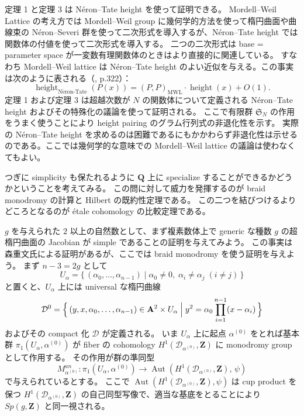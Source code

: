 \documentclass[uplatex,dvipdfmx]{jlreq}
\def\height{\operatorname{height}}
\def\Aut{\operatorname{Aut}}
\begin{document}
定理 1 と定理 3 は Néron--Tate height を使って証明できる。
Mordell--Weil Lattice の考え方では Mordell--Weil group に幾何学的方法を使って楕円曲面や曲線束の Néron--Severi 群を使って二次形式を導入するが、Néron--Tate height では関数体の付値を使って二次形式を導入する。
二つの二次形式は base = parameter space が一変数有理関数体のときはより直接的に関連している。
すなわち Mordell--Weil lattice は Néron--Tate height のよい近似を与える。この事実は次のように表される（\cite{L}, p.322）：
\[
  \height_{\mathrm{N\acute{e}ron\text{-}Tate}}(P(x))
  = (P, P)_{\mathrm{MWL}} \cdot \height(x) + O(1).
\]
定理 1 および定理 3 は超越次数が $N$ の関数体について定義される Néron--Tate height およびその特殊化の議論を使って証明される。
ここで有限群 $\mathfrak{S}_N$ の作用をうまく使うことにより height pairing のグラム行列式の非退化性を示す。
実際の Néron--Tate height を求めるのは困難であるにもかかわらず非退化性は示せるのである。ここでは幾何学的な意味での Mordell--Weil lattice の議論は使わなくてもよい。

つぎに simplicity も保たれるように $\mathbf{Q}$ 上に specialize することができるかどうかということを考えてみる。
この問に対して威力を発揮するのが braid monodromy の計算と Hilbert の既約性定理である。
この二つを結びつけるよりどころとなるのが étale cohomology の比較定理である。

$g$ を与えられた $2$ 以上の自然数として、まず複素数体上で generic な種数 $g$ の超楕円曲面の Jacobian が simple であることの証明を与えてみよう。
この事実は森重文氏による証明があるが、ここでは braid monodromy を使う証明を与えよう。
まず $n - 3 = 2g$ として
\[
  U_{\alpha} = \bigl\{\, (\alpha_0, \dots, \alpha_{n-1}) \mid \alpha_0 \neq 0,\; \alpha_i \neq \alpha_j \; (i \neq j) \,\bigr\}
\]
と置くと、$U_{\alpha}$ 上には universal な楕円曲線
\[
  \mathcal{D}^0 = \Bigl\{\, (y, x, \alpha_0, \dots, \alpha_{n-1}) \in \mathbf{A}^2 \times U_{\alpha} \Bigm| y^2 = \alpha_0 \prod_{i=1}^{n-1}(x - \alpha_i) \,\Bigr\}
\]
およびその compact 化 $\mathcal{D}$ が定義される。
いま $U_{\alpha}$ 上に起点 $\alpha^{(0)}$ をとれば基本群 $\pi_1(U_{\alpha}, \alpha^{(0)})$ が fiber の cohomology $H^1(\mathcal{D}_{\alpha^{(0)}}, \mathbf{Z})$ に monodromy group として作用する。
その作用が群の準同型
\[
  M_{\alpha^{(0)}}^{an} : \pi_1(U_{\alpha}, \alpha^{(0)}) \to \Aut(H^1(\mathcal{D}_{\alpha^{(0)}}, \mathbf{Z}),\, \psi)
\]
で与えられているとする。
ここで $\Aut(H^1(\mathcal{D}_{\alpha^{(0)}}, \mathbf{Z}), \psi)$ は cup product を保つ $H^1(\mathcal{D}_{\alpha^{(0)}}, \mathbf{Z})$ の自己同型写像で、適当な基底をとることにより $Sp(g, \mathbf{Z})$ と同一視される。
\end{document}

